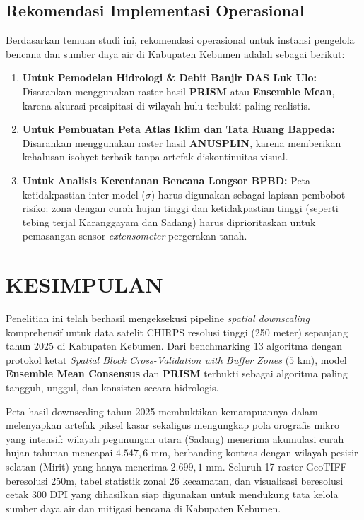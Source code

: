 \documentclass[11pt,a4paper]{article}
\begin{document}
\subsection{Rekomendasi Implementasi Operasional}
Berdasarkan temuan studi ini, rekomendasi operasional untuk instansi pengelola bencana dan sumber daya air di Kabupaten Kebumen adalah sebagai berikut:
\begin{enumerate}
    \item \textbf{Untuk Pemodelan Hidrologi \& Debit Banjir DAS Luk Ulo:} Disarankan menggunakan raster hasil \textbf{PRISM} atau \textbf{Ensemble Mean}, karena akurasi presipitasi di wilayah hulu terbukti paling realistis.
    \item \textbf{Untuk Pembuatan Peta Atlas Iklim dan Tata Ruang Bappeda:} Disarankan menggunakan raster hasil \textbf{ANUSPLIN}, karena memberikan kehalusan isohyet terbaik tanpa artefak diskontinuitas visual.
    \item \textbf{Untuk Analisis Kerentanan Bencana Longsor BPBD:} Peta ketidakpastian inter-model ($\sigma$) harus digunakan sebagai lapisan pembobot risiko: zona dengan curah hujan tinggi dan ketidakpastian tinggi (seperti tebing terjal Karanggayam dan Sadang) harus diprioritaskan untuk pemasangan sensor \textit{extensometer} pergerakan tanah.
\end{enumerate}

\section{KESIMPULAN}
Penelitian ini telah berhasil mengeksekusi pipeline \textit{spatial downscaling} komprehensif untuk data satelit CHIRPS resolusi tinggi (250 meter) sepanjang tahun 2025 di Kabupaten Kebumen. Dari benchmarking 13 algoritma dengan protokol ketat \textit{Spatial Block Cross-Validation with Buffer Zones} ($5\text{ km}$), model \textbf{Ensemble Mean Consensus} dan \textbf{PRISM} terbukti sebagai algoritma paling tangguh, unggul, dan konsisten secara hidrologis. 

Peta hasil downscaling tahun 2025 membuktikan kemampuannya dalam melenyapkan artefak piksel kasar sekaligus mengungkap pola orografis mikro yang intensif: wilayah pegunungan utara (Sadang) menerima akumulasi curah hujan tahunan mencapai $4.547,6\text{ mm}$, berbanding kontras dengan wilayah pesisir selatan (Mirit) yang hanya menerima $2.699,1\text{ mm}$. Seluruh 17 raster GeoTIFF beresolusi 250m, tabel statistik zonal 26 kecamatan, dan visualisasi beresolusi cetak 300 DPI yang dihasilkan siap digunakan untuk mendukung tata kelola sumber daya air dan mitigasi bencana di Kabupaten Kebumen.
\end{document}
